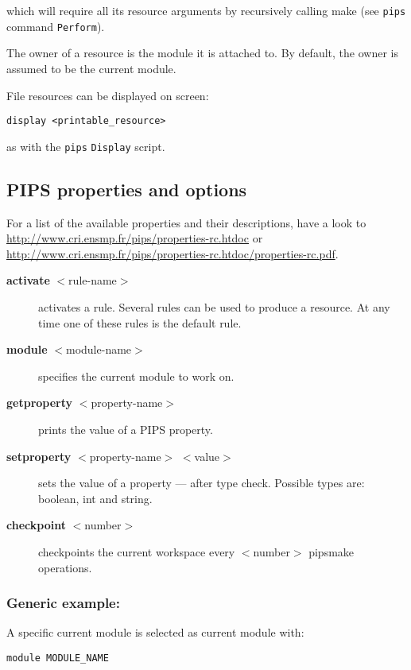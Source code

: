 \documentclass[a4paper]{article}
\newcommand{\PipsPIPSpropertiesPDF}{\url{http://www.cri.ensmp.fr/pips/properties-rc.htdoc/properties-rc.pdf}\xspace}
\newcommand{\PipsPIPSpropertiesHTDOC}{\url{http://www.cri.ensmp.fr/pips/properties-rc.htdoc}\xspace}
\begin{document}
which will require all its resource arguments by recursively
calling make (see \texttt{pips} command \texttt{Perform}).

The owner of a resource is the module it is attached to. By
default, the owner is assumed to be the current module.

File resources can be displayed on screen:

{\bf
\begin{verbatim}
display <printable_resource> 
\end{verbatim}
}
as with the \texttt{pips} \texttt{Display} script.


\subsection{PIPS properties and options}

For a list of the available properties and their descriptions, have a look
to \PipsPIPSpropertiesHTDOC or \PipsPIPSpropertiesPDF.

\begin{description}
\item[{\bf activate} $<$rule-name$>$] activates a rule. Several rules
  can be used to produce a resource. At any time one of these rules is the
  default rule.

\item[{\bf module} $<$module-name$>$] specifies the current module to
  work on.

\item[{\bf getproperty} $<$property-name$>$] prints the value of a PIPS
  property.

\item[{\bf setproperty} $<$property-name$>$ $<$value$>$] sets the value
  of a property --- after type check. Possible types are: boolean, int and
  string.

\item[{\bf checkpoint} $<$number$>$] checkpoints the current workspace
  every $<$number$>$ pipsmake operations.

\end{description}
 
\subsubsection*{Generic example:}

A specific current module is selected as current module with:
{\bf
\begin{verbatim}
module MODULE_NAME
\end{verbatim}
}
\end{document}

